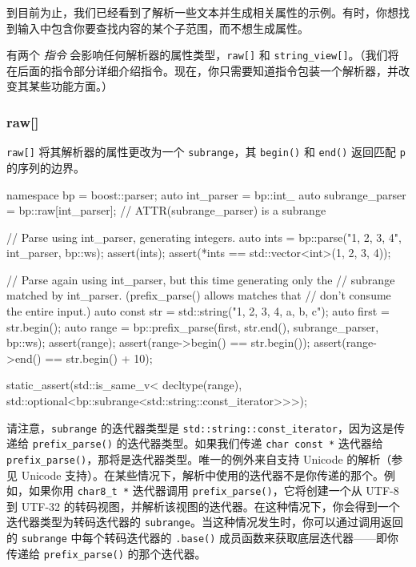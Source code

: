 到目前为止，我们已经看到了解析一些文本并生成相关属性的示例。有时，你想找到输入中包含你要查找内容的某个子范围，而不想生成属性。

有两个 \emph{指令} 会影响任何解析器的属性类型，\texttt{raw{[}{]}} 和 \texttt{string\_view{[}{]}}。（我们将在后面的指令部分详细介绍指令。现在，你只需要知道指令包装一个解析器，并改变其某些功能方面。）

\subsubsection{raw{[}{]}}

\texttt{raw{[}{]}} 将其解析器的属性更改为一个 \texttt{subrange}，其 \texttt{begin()} 和 \texttt{end()} 返回匹配 \texttt{p} 的序列的边界。

\begin{code}
namespace bp = boost::parser;
auto int_parser = bp::int_ %
auto subrange_parser = bp::raw[int_parser];  // ATTR(subrange_parser) is a subrange

// Parse using int_parser, generating integers.
auto ints = bp::parse("1, 2, 3, 4", int_parser, bp::ws);
assert(ints);
assert(*ints == std::vector<int>({1, 2, 3, 4}));

// Parse again using int_parser, but this time generating only the
// subrange matched by int_parser.  (prefix_parse() allows matches that
// don't consume the entire input.)
auto const str = std::string("1, 2, 3, 4, a, b, c");
auto first = str.begin();
auto range = bp::prefix_parse(first, str.end(), subrange_parser, bp::ws);
assert(range);
assert(range->begin() == str.begin());
assert(range->end() == str.begin() + 10);

static_assert(std::is_same_v<
              decltype(range),
              std::optional<bp::subrange<std::string::const_iterator>>>);
\end{code}

请注意，\texttt{subrange} 的迭代器类型是 \texttt{std::string::const\_iterator}，因为这是传递给 \texttt{prefix\_parse()} 的迭代器类型。如果我们传递 \texttt{char const *} 迭代器给 \texttt{prefix\_parse()}，那将是迭代器类型。唯一的例外来自支持 Unicode 的解析（参见 Unicode 支持）。在某些情况下，解析中使用的迭代器不是你传递的那个。例如，如果你用 \texttt{char8\_t *} 迭代器调用 \texttt{prefix\_parse()}，它将创建一个从 UTF-8 到 UTF-32 的转码视图，并解析该视图的迭代器。在这种情况下，你会得到一个迭代器类型为转码迭代器的 \texttt{subrange}。当这种情况发生时，你可以通过调用返回的 \texttt{subrange} 中每个转码迭代器的 \texttt{.base()} 成员函数来获取底层迭代器——即你传递给 \texttt{prefix\_parse()} 的那个迭代器。

